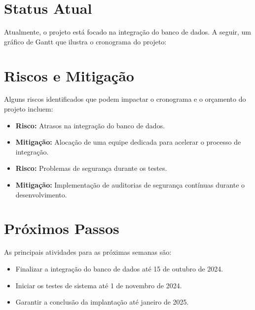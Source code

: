 \documentclass[12pt]{article}
\begin{document}
\section*{Status Atual}
Atualmente, o projeto está focado na integração do banco de dados. A seguir, um gráfico de Gantt que ilustra o cronograma do projeto:

\begin{center}
\end{center}

\section*{Riscos e Mitigação}
Alguns riscos identificados que podem impactar o cronograma e o orçamento do projeto incluem:
\begin{itemize}
    \item \textbf{Risco:} Atrasos na integração do banco de dados.
    \item \textbf{Mitigação:} Alocação de uma equipe dedicada para acelerar o processo de integração.
    \item \textbf{Risco:} Problemas de segurança durante os testes.
    \item \textbf{Mitigação:} Implementação de auditorias de segurança contínuas durante o desenvolvimento.
\end{itemize}

\section*{Próximos Passos}
As principais atividades para as próximas semanas são:
\begin{itemize}
    \item Finalizar a integração do banco de dados até 15 de outubro de 2024.
    \item Iniciar os testes de sistema até 1 de novembro de 2024.
    \item Garantir a conclusão da implantação até janeiro de 2025.
\end{itemize}
\end{document}
